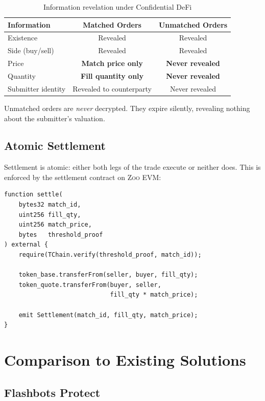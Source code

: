 \documentclass[11pt,letterpaper]{article}
\theoremstyle{definition}
\theoremstyle{remark}
\newcommand{\Zoo}{\textsc{Zoo}}
\begin{document}
\begin{table}[h]
\centering
\begin{tabular}{lcc}
\toprule
\textbf{Information} & \textbf{Matched Orders} & \textbf{Unmatched Orders} \\
\midrule
Existence & Revealed & Revealed \\
Side (buy/sell) & Revealed & Revealed \\
Price & \textbf{Match price only} & \textbf{Never revealed} \\
Quantity & \textbf{Fill quantity only} & \textbf{Never revealed} \\
Submitter identity & Revealed to counterparty & Never revealed \\
\bottomrule
\end{tabular}
\caption{Information revelation under Confidential DeFi}
\label{tab:revelation}
\end{table}

Unmatched orders are \emph{never} decrypted. They expire silently, revealing nothing about the submitter's valuation.

\subsection{Atomic Settlement}

Settlement is atomic: either both legs of the trade execute or neither does. This is enforced by the settlement contract on \Zoo{} EVM:

\begin{verbatim}
function settle(
    bytes32 match_id,
    uint256 fill_qty,
    uint256 match_price,
    bytes   threshold_proof
) external {
    require(TChain.verify(threshold_proof, match_id));

    token_base.transferFrom(seller, buyer, fill_qty);
    token_quote.transferFrom(buyer, seller,
                             fill_qty * match_price);

    emit Settlement(match_id, fill_qty, match_price);
}
\end{verbatim}

\section{Comparison to Existing Solutions}
\label{sec:comparison}

\subsection{Flashbots Protect}
\end{document}
